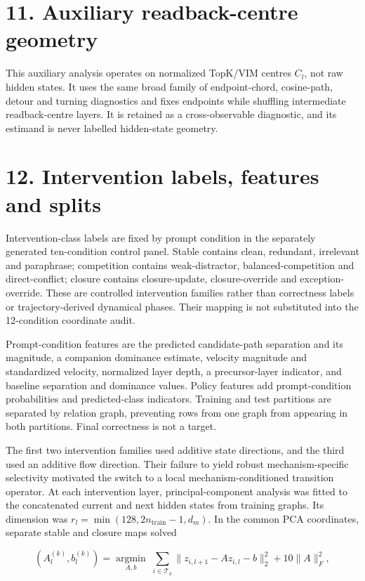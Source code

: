 \documentclass[10pt]{article}
\begin{document}
\section*{11. Auxiliary readback-centre geometry}

This auxiliary analysis operates on normalized TopK/VIM centres \(C_l\), not raw hidden states. It uses the same broad family of endpoint-chord, cosine-path, detour and turning diagnostics and fixes endpoints while shuffling intermediate readback-centre layers. It is retained as a cross-observable diagnostic, and its estimand is never labelled hidden-state geometry.

\section*{12. Intervention labels, features and splits}

Intervention-class labels are fixed by prompt condition in the separately generated ten-condition control panel. Stable contains clean, redundant, irrelevant and paraphrase; competition contains weak-distractor, balanced-competition and direct-conflict; closure contains closure-update, closure-override and exception-override. These are controlled intervention families rather than correctness labels or trajectory-derived dynamical phases. Their mapping is not substituted into the 12-condition coordinate audit.

Prompt-condition features are the predicted candidate-path separation and its magnitude, a companion dominance estimate, velocity magnitude and standardized velocity, normalized layer depth, a precursor-layer indicator, and baseline separation and dominance values. Policy features add prompt-condition probabilities and predicted-class indicators. Training and test partitions are separated by relation graph, preventing rows from one graph from appearing in both partitions. Final correctness is not a target.

The first two intervention families used additive state directions, and the third used an additive flow direction. Their failure to yield robust mechanism-specific selectivity motivated the switch to a local mechanism-conditioned transition operator. At each intervention layer, principal-component analysis was fitted to the concatenated current and next hidden states from training graphs. Its dimension was \(r_l=\min(128,2n_{\mathrm{train}}-1,d_m)\). In the common PCA coordinates, separate stable and closure maps solved

\begin{equation*}
(A_l^{(k)},b_l^{(k)})=\underset{A,b}{\operatorname{argmin}}\;\sum_{i\in\mathcal T_k}\lVert z_{i,l+1}-Az_{i,l}-b\rVert_2^2+10\lVert A\rVert_F^2,
\end{equation*}
\end{document}
